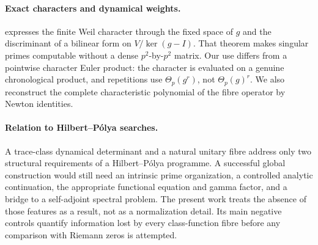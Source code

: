 \paragraph{Exact characters and dynamical weights.}
\citet{thomas2008} expresses the finite Weil character through the fixed
space of \(g\) and the discriminant of a bilinear form on
\(V/\ker(g-I)\).  That theorem makes singular primes computable without a
dense \(p^2\)-by-\(p^2\) matrix.  Our use differs from a pointwise character
Euler product: the character is evaluated on a genuine chronological product,
and repetitions use \(\Theta_p(g^r)\), not \(\Theta_p(g)^r\).  We also
reconstruct the complete characteristic polynomial of the fibre operator by
Newton identities.

\paragraph{Relation to Hilbert--P\'olya searches.}
A trace-class dynamical determinant and a natural unitary fibre address only
two structural requirements of a Hilbert--P\'olya programme.  A successful
global construction would still need an intrinsic prime organization, a
controlled analytic continuation, the appropriate functional equation and
gamma factor, and a bridge to a self-adjoint spectral problem.  The present
work treats the absence of those features as a result, not as a normalization
detail.  Its main negative controls quantify information lost by every
class-function fibre before any comparison with Riemann zeros is attempted.
